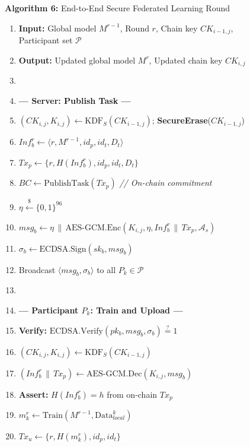 \documentclass[journal, 10pt, twocolumn]{IEEEtran}
\begin{document}
\begin{figure}[!t]
\hrulefill
\vspace{-0.2cm}
\begin{center}
\textbf{Algorithm 6:} End-to-End Secure Federated Learning Round
\end{center}
\vspace{-0.2cm}
\hrulefill
\begin{enumerate}
    \item \textbf{Input:} Global model $M^{r-1}$, Round $r$, Chain key $CK_{i-1,j}$, Participant set $\mathcal{P}$
    \item \textbf{Output:} Updated global model $M^r$, Updated chain key $CK_{i,j}$
    \item[]
    \item[] \textbf{--- Server: Publish Task ---}
    \item $(CK_{i,j}, K_{i,j}) \leftarrow \text{KDF}_S(CK_{i-1,j})$; \quad \textbf{SecureErase}($CK_{i-1,j}$)
    \item $Inf_b^r \leftarrow \langle r, M^{r-1}, id_p, id_t, D_t \rangle$
    \item $Tx_p \leftarrow \{r, H(Inf_b^r), id_p, id_t, D_t\}$
    \item $BC \leftarrow \text{PublishTask}(Tx_p)$ \quad \textit{// On-chain commitment}
    \item $\eta \xleftarrow{\$} \{0,1\}^{96}$
    \item $msg_b \leftarrow \eta \,\|\, \text{AES-GCM.Enc}(K_{i,j}, \eta, Inf_b^r \,\|\, Tx_p, \mathcal{A}_s)$
    \item $\sigma_b \leftarrow \text{ECDSA.Sign}(sk_b, msg_b)$
    \item Broadcast $\langle msg_b, \sigma_b \rangle$ to all $P_k \in \mathcal{P}$
    \item[]
    \item[] \textbf{--- Participant $P_k$: Train and Upload ---}
    \item \textbf{Verify:} $\text{ECDSA.Verify}(pk_b, msg_b, \sigma_b) \stackrel{?}{=} 1$
    \item $(CK_{i,j}, K_{i,j}) \leftarrow \text{KDF}_S(CK_{i-1,j})$
    \item $(Inf_b^r \,\|\, Tx_p) \leftarrow \text{AES-GCM.Dec}(K_{i,j}, msg_b)$
    \item \textbf{Assert:} $H(Inf_b^r) = h$ from on-chain $Tx_p$
    \item $m_k^r \leftarrow \text{Train}(M^{r-1}, \text{Data}_{local}^k)$
    \item $Tx_u \leftarrow \{r, H(m_k^r), id_p, id_t\}$

\end{enumerate}
\end{figure}
\end{document}
